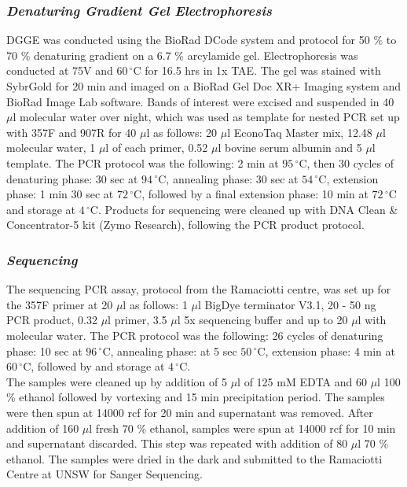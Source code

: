 \documentclass[twoside]{article}
\begin{document}
\subsubsection{\emph{Denaturing Gradient Gel Electrophoresis}}
DGGE was conducted using the BioRad DCode system and protocol for 50 \% to 70 \% denaturing gradient on a 6.7 \% arcylamide gel. Electrophoresis was conducted at 75V and $60\,^{\circ}\mathrm{C}$ for 16.5 hrs in 1x TAE. The gel was stained with SybrGold for 20 min and imaged on a BioRad Gel Doc XR+ Imaging system and BioRad Image Lab software. Bands of interest were excised and suspended in 40 $\mu$l molecular water over night, which was used as template for nested PCR set up with 357F and 907R for 40 $\mu$l as follows: 20 $\mu$l EconoTaq Master mix, 12.48 $\mu$l molecular water, 1 $\mu$l of each primer, 0.52 $\mu$l bovine serum albumin and 5 $\mu$l template. The PCR protocol was the following: 2 min at $95\,^{\circ}\mathrm{C}$, then 30 cycles of denaturing phase: 30 sec at $94\,^{\circ}\mathrm{C}$, annealing phase: 30 sec at  $54\,^{\circ}\mathrm{C}$, extension phase: 1 min 30 sec at $72\,^{\circ}\mathrm{C}$, followed by a final extension phase: 10 min at $72\,^{\circ}\mathrm{C}$ and storage at $4\,^{\circ}\mathrm{C}$. Products for sequencing were cleaned up with DNA Clean \& Concentrator-5 kit (Zymo Research), following the PCR product protocol.

\subsubsection{\emph{Sequencing}}
The sequencing PCR assay, protocol from the Ramaciotti centre, was set up for the 357F primer at 20 $\mu$l as follows: 1 $\mu$l BigDye terminator V3.1, 20 - 50 ng PCR product, 0.32 $\mu$l primer, 3.5 $\mu$l 5x sequencing buffer and up to 20 $\mu$l with molecular water. The PCR protocol was the following: 26 cycles of denaturing phase: 10 sec at $96\,^{\circ}\mathrm{C}$, annealing phase:  at 5 sec $50\,^{\circ}\mathrm{C}$, extension phase: 4 min at $60\,^{\circ}\mathrm{C}$, followed by and storage at $4\,^{\circ}\mathrm{C}$.\\

The samples were cleaned up by addition of 5 $\mu$l of 125 mM EDTA and 60 $\mu$l 100 \% ethanol followed by vortexing and 15 min precipitation period. The samples were then spun at 14000 rcf for 20 min and supernatant was removed. After addition of 160 $\mu$l fresh 70 \% ethanol, samples were spun at 14000 rcf for 10 min and supernatant discarded. This step was repeated with addition of 80 $\mu$l 70 \% ethanol. The samples were dried in the dark and submitted to the Ramaciotti Centre at UNSW for Sanger Sequencing.
\end{document}
